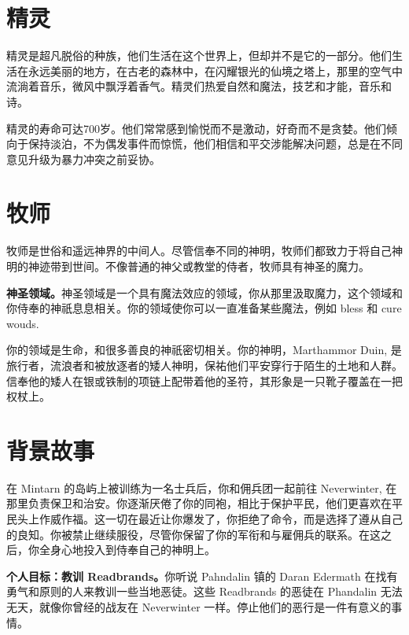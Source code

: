 \documentclass[letterpaper,twocolumn,openany,nodeprecatedcode]{dndbook}
\begin{document}



\mainmatter%

\section{精灵}

\footnotesize

精灵是超凡脱俗的种族，他们生活在这个世界上，但却并不是它的一部分。他们生活在永远美丽的地方，在古老的森林中，在闪耀银光的仙境之塔上，那里的空气中流淌着音乐，微风中飘浮着香气。精灵们热爱自然和魔法，技艺和才能，音乐和诗。

精灵的寿命可达700岁。他们常常感到愉悦而不是激动，好奇而不是贪婪。他们倾向于保持淡泊，不为偶发事件而惊慌，他们相信和平交涉能解决问题，总是在不同意见升级为暴力冲突之前妥协。

\section{牧师}

牧师是世俗和遥远神界的中间人。尽管信奉不同的神明，牧师们都致力于将自己神明的神迹带到世间。不像普通的神父或教堂的侍者，牧师具有神圣的魔力。

\textbf{神圣领域。}神圣领域是一个具有魔法效应的领域，你从那里汲取魔力，这个领域和你侍奉的神祇息息相关。你的领域使你可以一直准备某些魔法，例如 bless 和 cure wouds.

你的领域是生命，和很多善良的神祇密切相关。你的神明，Marthammor Duin, 是旅行者，流浪者和被放逐者的矮人神明，保祐他们平安穿行于陌生的土地和人群。信奉他的矮人在银或铁制的项链上配带着他的圣符，其形象是一只靴子覆盖在一把权杖上。

\section{背景故事}

在 Mintarn 的岛屿上被训练为一名士兵后，你和佣兵团一起前往 Neverwinter, 在那里负责保卫和治安。你逐渐厌倦了你的同袍，相比于保护平民，他们更喜欢在平民头上作威作福。这一切在最近让你爆发了，你拒绝了命令，而是选择了遵从自己的良知。你被禁止继续服役，尽管你保留了你的军衔和与雇佣兵的联系。在这之后，你全身心地投入到侍奉自己的神明上。

\textbf{个人目标：教训 Readbrands。}你听说 Pahndalin 镇的 Daran Edermath 在找有勇气和原则的人来教训一些当地恶徒。这些 Readbrands 的恶徒在 Phandalin 无法无天，就像你曾经的战友在 Neverwinter 一样。停止他们的恶行是一件有意义的事情。
\end{document}
